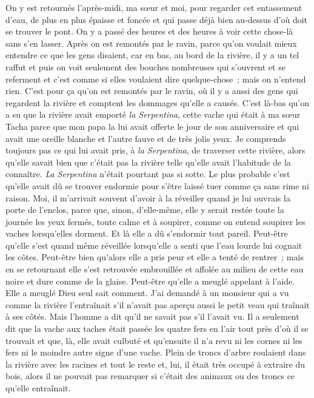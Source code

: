 \pend
%
\pstart
	On y est retournés l’après-midi, ma sœur et moi, pour regarder cet entassement d’eau, de plus en plus épaisse et foncée et qui passe déjà bien au-dessus d’où doit se trouver le pont. On y a passé des heures et des heures à voir cette chose-là sans s'en lasser. Après on est remontés par le ravin, parce qu’on voulait mieux entendre ce que les gens disaient, car en bas, au bord de la rivière, il y a un tel raffut et puis on voit seulement des bouches nombreuses qui s’ouvrent et se referment et c’est comme si elles voulaient dire quelque-chose ; mais on n’entend rien. C’est pour ça qu’on est remontés par le ravin, où il y a aussi des gens qui regardent la rivière et comptent les dommages qu’elle a causés. C’est là-bas qu’on a su que la rivière avait emporté \textit{la Serpentina}, cette vache qui était à ma sœur Tacha parce que mon papa la lui avait offerte le jour de son anniversaire et qui avait une oreille blanche et l’autre fauve et de très jolis yeux.
\pend
%
\pstart
	Je comprends toujours pas ce qui lui avait pris, à \textit{la Serpentina}, de traverser cette rivière, alors qu’elle savait bien que c’était pas la rivière telle qu’elle avait l’habitude de la connaître. \textit{La Serpentina} n’était pourtant pas si sotte. Le plus probable c’est qu’elle avait dû se trouver endormie pour s’être laissé tuer comme ça sans rime ni raison. Moi, il m’arrivait souvent d'avoir à la réveiller quand je lui ouvrais la porte de l’enclos, parce que, sinon, d’elle-même, elle y serait restée toute la journée les yeux fermés, toute calme et à soupirer, comme on entend soupirer les vaches lorsqu’elles dorment.
\pend
%
\pstart
	Et là elle a dû s'endormir tout pareil. Peut-être qu’elle s’est quand même réveillée lorsqu’elle a senti que l’eau lourde lui cognait les côtes. Peut-être bien qu’alors elle a pris peur et elle a tenté de rentrer ; mais en se retournant elle s’est retrouvée embrouillée et affolée au milieu de cette eau noire et dure comme de la glaise. Peut-être qu’elle a meuglé appelant à l’aide.
\pend
%
\pstart
	Elle a meuglé Dieu seul sait comment.
\pend
%
\pstart
	J’ai demandé à un monsieur qui a vu comme la rivière l’entraînait s’il n’avait pas aperçu aussi le petit veau qui traînait à ses côtés. Mais l’homme a dit qu’il ne savait pas s’il l’avait vu. Il a seulement dit que la vache aux taches était passée les quatre fers en l’air tout près d’où il se trouvait et que, là, elle avait culbuté et qu’ensuite il n’a revu ni les cornes ni les fers ni le moindre autre signe d’une vache. Plein de troncs d’arbre roulaient dans la rivière avec les racines et tout le reste et, lui, il était très occupé à extraire du bois, alors il ne pouvait pas remarquer si c’était des animaux ou des troncs ce qu’elle entraînait.
